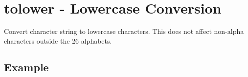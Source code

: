 %

\section{tolower - Lowercase Conversion\label{sect:tolower}}
Convert character string to lowercase characters. This does not affect non-alpha characters outside the 26 alphabets. 

\subsection*{Example}


%

